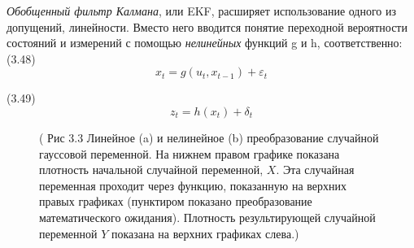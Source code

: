 \documentclass[10pt,a4paper]{article}
\begin{document}
\textit{Обобщенный фильтр Калмана}, или EKF, расширяет использование одного из допущений, линейности. Вместо него вводится понятие переходной вероятности состояний и измерений  с помощью \textit{нелинейных} функций g и h, соответственно:\\

(3.48)
$$x_t=g(u_t,x_{t-1})+\varepsilon_t$$

(3.49)
$$z_t=h(x_t)+\delta_t$$

\begin{figure}[H]
	\caption{ (  Рис 3.3	Линейное (a) и нелинейное (b) преобразование случайной гауссовой переменной. На нижнем правом графике показана плотность начальной случайной переменной, $X$. Эта случайная переменная проходит через функцию, показанную на верхних правых графиках (пунктиром показано преобразование математического ожидания). Плотность результирующей случайной переменной $Y$ показана на верхних графиках слева.)}
	\label{fig:33orig}
\end{figure}
 
\end{document}
